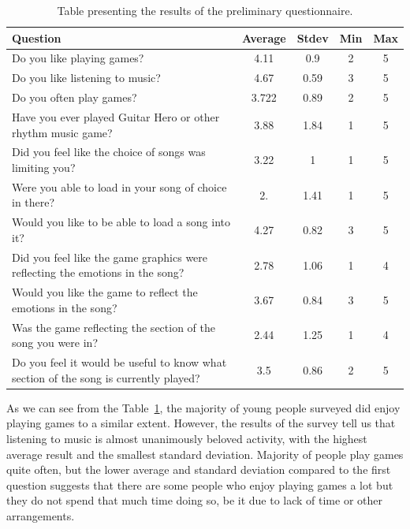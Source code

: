 \begin{table}[b]
\begin{center}
\begin{tabular}{| p{8cm} | c | c | c | c | } 																								      \hline 
\textbf{Question} & \textbf{Average} & \textbf{Stdev} & \textbf{Min} & \textbf{Max} 						   \\ \hline \hline
Do you like playing games? & 4.11 & 0.9 & 2 & 5		 					 					 									\\ \hline 
Do you like listening to music? & 4.67 & 0.59 & 3 & 5		 					 					 								\\ \hline 
Do you often play games? & 3.722 & 0.89 & 2 & 5 		 					 					 								\\ \hline 
Have you ever played Guitar Hero or other rhythm music game? & 3.88 & 1.84  & 1 & 5							\\ \hline 
Did you feel like the choice of songs was limiting you? & 3.22 & 1 & 1 & 5 					 							\\ \hline 
Were you able to load in your song of choice in there? & 2. & 1.41 & 1 & 5 					 							\\ \hline 
Would you like to be able to load a song into it? & 4.27 & 0.82 & 3 & 5 				 									\\ \hline 
Did you feel like the game graphics were reflecting the emotions in the song? & 2.78 & 1.06 & 1 & 4 			\\ \hline 
Would you like the game to reflect the emotions in the song? & 3.67 & 0.84 & 3 & 5 	 								\\ \hline 
Was the game reflecting the section of the song you were in? & 2.44 & 1.25 & 1 & 4  								\\ \hline 
Do you feel it would be useful to know what section of the song is currently played? & 3.5 & 0.86 & 2 & 5  	\\ \hline 
\end{tabular}
\caption{Table presenting the results of the preliminary questionnaire.}
\label{table:preliminaryquestions}
\end{center}
\end{table}

As we can see from the Table~\ref{table:preliminaryquestions}, the majority of young people surveyed did enjoy playing games to a similar extent. However, the results of the survey tell us that listening to music is almost unanimously beloved activity, with the highest average result and the smallest standard deviation. 
Majority of people play games quite often, but the lower average and standard deviation compared to the first question suggests that there are some people who enjoy playing games a lot but they do not spend that much time doing so, be it due to lack of time or other arrangements. 

